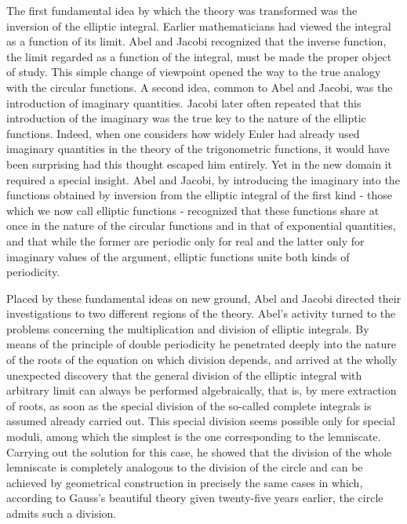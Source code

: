 \documentclass[11pt]{article}
\begin{document}
The first fundamental idea by which the theory was transformed was the inversion of the elliptic integral. Earlier mathematicians had viewed the integral as a function of its limit. Abel and Jacobi recognized that the inverse function, the limit regarded as a function of the integral, must be made the proper object of study. This simple change of viewpoint opened the way to the true analogy with the circular functions. A second idea, common to Abel and Jacobi, was the introduction of imaginary quantities. Jacobi later often repeated that this introduction of the imaginary was the true key to the nature of the elliptic functions. Indeed, when one considers how widely Euler had already used imaginary quantities in the theory of the trigonometric functions, it would have been surprising had this thought escaped him entirely. Yet in the new domain it required a special insight. Abel and Jacobi, by introducing the imaginary into the functions obtained by inversion from the elliptic integral of the first kind - those which we now call elliptic functions - recognized that these functions share at once in the nature of the circular functions and in that of exponential quantities, and that while the former are periodic only for real and the latter only for imaginary values of the argument, elliptic functions unite both kinds of periodicity.

Placed by these fundamental ideas on new ground, Abel and Jacobi directed their investigations to two different regions of the theory. Abel's activity turned to the problems concerning the multiplication and division of elliptic integrals. By means of the principle of double periodicity he penetrated deeply into the nature of the roots of the equation on which division depends, and arrived at the wholly unexpected discovery that the general division of the elliptic integral with arbitrary limit can always be performed algebraically, that is, by mere extraction of roots, as soon as the special division of the so-called complete integrals is assumed already carried out. This special division seems possible only for special moduli, among which the simplest is the one corresponding to the lemniscate. Carrying out the solution for this case, he showed that the division of the whole lemniscate is completely analogous to the division of the circle and can be achieved by geometrical construction in precisely the same cases in which, according to Gauss's beautiful theory given twenty-five years earlier, the circle admits such a division.
\end{document}
